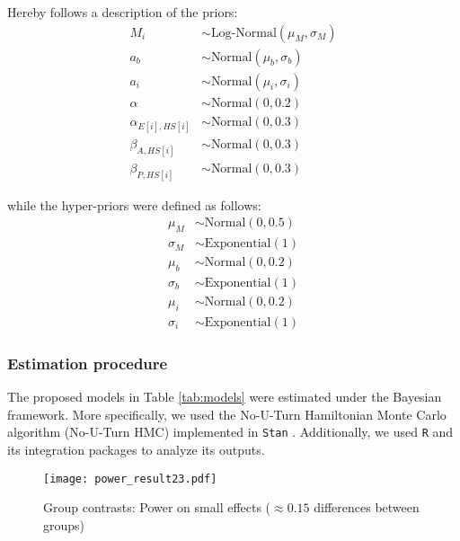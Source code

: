 Hereby follows a description of the priors:
%
\begin{align}
	M_{i} & \sim \text{Log-Normal}( \mu_{M}, \sigma_{M}) \\
	a_{b} & \sim \text{Normal}(\mu_{b}, \sigma_{b}) \\
	a_{i} & \sim \text{Normal}(\mu_{i}, \sigma_{i}) \\
	\alpha & \sim \text{Normal}(0, 0.2) \\
	\alpha_{E[i],HS[i]} & \sim \text{Normal}(0, 0.3) \\
	\beta_{A, HS[i]} & \sim \text{Normal}(0 , 0.3) \\
	\beta_{P, HS[i]} & \sim \text{Normal}(0, 0.3)
\end{align}

while the hyper-priors were defined as follows:
%
\begin{align}
	\mu_{M} & \sim \text{Normal}(0, 0.5) \\
	\sigma_{M} & \sim \text{Exponential}(1) \\
	\mu_{b} & \sim \text{Normal}(0, 0.2) \\
	\sigma_{b} & \sim \text{Exponential}(1) \\
	\mu_{i} & \sim \text{Normal}(0, 0.2) \\
	\sigma_{i} & \sim \text{Exponential}(1)
\end{align}
%
%
\subsubsection{Estimation procedure} \label{ssSA:model_estimation}
The proposed models in Table \ref{tab:models} were estimated under the Bayesian framework. More specifically, we used the No-U-Turn Hamiltonian Monte Carlo algorithm (No-U-Turn HMC) \citep{Betancourt_et_al_2013, Duane_et_al_1987, Hoffman_et_al_2014, Neal_2012} implemented in \texttt{Stan} \citep{Stan_2020}. Additionally, we used \texttt{R} \citep{R_2015} and its integration packages \citep{RStan_2020} to analyze its outputs.

\begin{comment}
	\footnote{see \citet{Rivera_2021} (p. 11-13, 15-27) for a detailed description of its benefits and shortcomings.}
\end{comment}
%
%
\begin{figure}[!h]
	\centering
	\texttt{[image: power\_result23.pdf]}
	\caption[Group contrasts: Power on small effects]{Group contrasts: Power on small effects ($\approx 0.15$ differences between groups)}
	\label{fig:contrasts}
\end{figure}
%
%

